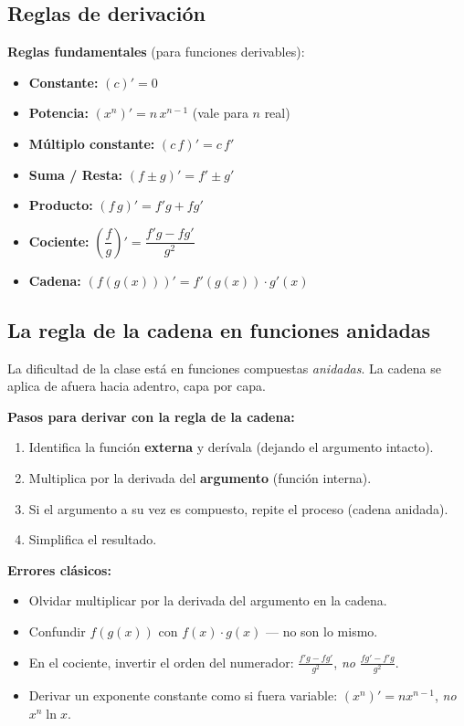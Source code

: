 \documentclass[12pt, letterpaper]{article}
\begin{document}
\subsection{Reglas de derivación}

\begin{cuadroteoria}
  \textbf{Reglas fundamentales} (para funciones derivables):
  \begin{itemize}
    \item \textbf{Constante:} $(c)' = 0$
    \item \textbf{Potencia:} $(x^n)' = n\,x^{n-1}$ \qquad (vale para $n$ real)
    \item \textbf{Múltiplo constante:} $(c\,f)' = c\,f'$
    \item \textbf{Suma / Resta:} $(f \pm g)' = f' \pm g'$
    \item \textbf{Producto:} $(f\,g)' = f'g + fg'$
    \item \textbf{Cociente:} $\left(\dfrac{f}{g}\right)' = \dfrac{f'g - fg'}{g^2}$
    \item \textbf{Cadena:} $(f(g(x)))' = f'(g(x))\cdot g'(x)$
  \end{itemize}
\end{cuadroteoria}

\subsection{La regla de la cadena en funciones anidadas}

La dificultad de la clase está en funciones compuestas \emph{anidadas}. La cadena se aplica de afuera hacia adentro, capa por capa.

\begin{cuadropasos}
  \textbf{Pasos para derivar con la regla de la cadena:}
  \begin{enumerate}
    \item Identifica la función \textbf{externa} y derívala (dejando el argumento intacto).
    \item Multiplica por la derivada del \textbf{argumento} (función interna).
    \item Si el argumento a su vez es compuesto, repite el proceso (cadena anidada).
    \item Simplifica el resultado.
  \end{enumerate}
\end{cuadropasos}

\begin{cuadroadvertencia}
  \textbf{Errores clásicos:}
  \begin{itemize}
    \item Olvidar multiplicar por la derivada del argumento en la cadena.
    \item Confundir $f(g(x))$ con $f(x)\cdot g(x)$ — no son lo mismo.
    \item En el cociente, invertir el orden del numerador: $\frac{f'g - fg'}{g^2}$, \emph{no} $\frac{fg' - f'g}{g^2}$.
    \item Derivar un exponente constante como si fuera variable: $(x^n)' = n x^{n-1}$, \emph{no} $x^n \ln x$.
  \end{itemize}
\end{cuadroadvertencia}
\end{document}
